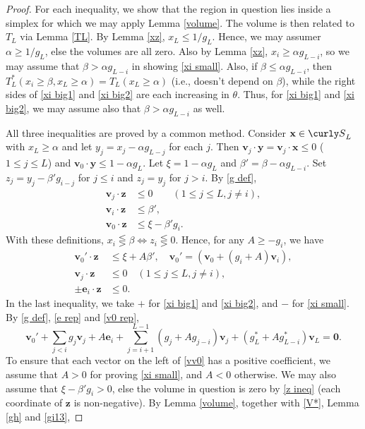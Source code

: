 \documentclass[11pt]{amsart}
\theoremstyle{remark}
\theoremstyle{plain}
\numberwithin{equation}{section}
\newcommand{\be}{\begin{equation}}
\newcommand{\ee}{\end{equation}}
\renewcommand{\a}{\ensuremath{\alpha}}
\renewcommand{\b}{\ensuremath{\beta}}
\renewcommand{\(}{\left(}
\renewcommand{\)}{\right)}
\newcommand{\fancyS}{{\curly S}}
\renewcommand{\le}{\leqslant}
\renewcommand{\ge}{\geqslant}
\newcommand{\vzz}{\mathbf{z}}
\newcommand{\vx}{\mathbf{x}}
\newcommand{\vy}{\mathbf{y}}
\newcommand{\vv}{\mathbf{v}}
\newcommand{\vz}{\mathbf{0}}
\newcommand{\ve}{\mathbf{e}}
\begin{document}
\begin{proof}
For each inequality, we show that the region in question lies inside
a simplex for which we may apply Lemma \ref{volume}.  The volume is then
related to $T_L$ via Lemma \ref{TL}.  By Lemma \ref{xz}, $x_L \le 1/g_L$.  
Hence, we may assumer $\a \ge 1/g_L$, else the volumes are all zero.
Also by Lemma \ref{xz}, $x_i \ge \a g_{L-i}$, so we may assume that
$\b > \a g_{L-i}$ in showing \eqref{xi small}.  Also, if $\b \le \a g_{L-i}$,
then $T_L^*(x_i\ge\b,x_L\ge \a)=T_L(x_L\ge \a)$ (i.e., doesn't depend on $\b$),
while the right sides of \eqref{xi big1} and \eqref{xi big2} are each increasing in $\theta$.
Thus, for \eqref{xi big1} and \eqref{xi big2}, we may assume also that $\b > \a g_{L-i}$ as well.

All three inequalities are proved by a common method.
Consider $\vx\in \fancyS_L$ with $x_L\ge \a$
and let $y_j = x_j - \a g_{L-j}$ for each $j$.
Then $\vv_j \cdot \vy = \vv_j\cdot \vx \le 0$  ($1\le j\le L$) and $\vv_0 \cdot \vy \le 1 - \a
g_L$.  Let $\xi=1-\a g_L$ and $\b' = \b-\a g_{L-i}$. 
Set $z_j=y_j-\b'g_{i-j}$
for $j\le i$ and $z_j=y_j$ for $j>i$. By \eqref{g def},
\be\begin{split}\label{z ineq}
\vv_j \cdot \vzz &\le 0 \qquad (1\le j\le L, j\ne i), \\
\vv_i \cdot \vzz &\le \b', \\
\vv_0 \cdot \vzz &\le \xi-\b'g_i.
\end{split}\ee
With these definitions, $x_i\lesseqgtr\b \iff z_i \lesseqgtr 0$.
Hence, for any $A\ge -g_i$, we have 
\be\label{vv0}\begin{split}
\vv_0' \cdot \vzz &\le \xi + A\b', \quad \vv_0' = (\vv_0 + (g_i+A)\vv_i),\\
\vv_j \cdot \vzz &\le 0 \quad (1\le j\le L, j\ne i), \\
\pm \ve_i \cdot \vzz &\le 0.
\end{split}\ee
In the last inequality, we take $+$ for \eqref{xi big1} and \eqref{xi big2}, 
and $-$ for \eqref{xi small}.
By \eqref{g def}, \eqref{e rep} and \eqref{v0 rep}, 
\be\label{Av}
\vv_0' + \sum_{j<i} g_j \vv_j + A \ve_i + \sum_{j=i+1}^{L-1}
(g_j+Ag_{j-i}) \vv_j + (g_L^*+Ag_{L-i}^*)\vv_L = \vz.
\ee
To ensure that each vector on the left of \eqref{vv0} has a positive
coefficient, we assume that $A>0$ for proving \eqref{xi small}, and $A<0$
otherwise.  We may also assume that $\xi-\b' g_i >0$, else the volume in question
is zero by \eqref{z ineq} (each coordinate of $\vzz$ is non-negative).
By Lemma \ref{volume}, together with \eqref{V*}, Lemma \ref{gh} and \eqref{gi13},

\end{proof}
\end{document}
